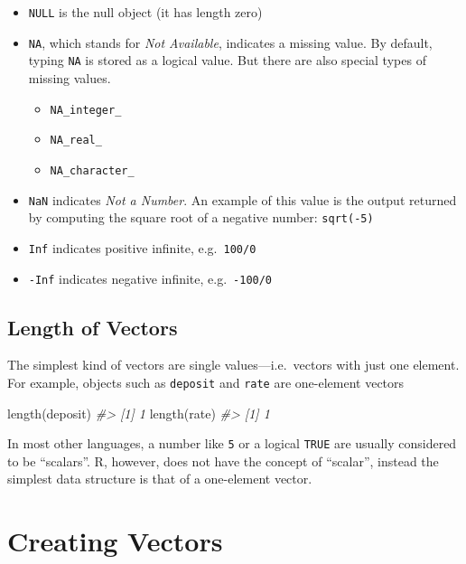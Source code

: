 \documentclass[
]{book}
\newenvironment{Shaded}{\begin{snugshade}}{\end{snugshade}}
\newcommand{\CommentTok}[1]{\textcolor[rgb]{0.56,0.35,0.01}{\textit{#1}}}
\newcommand{\FunctionTok}[1]{\textcolor[rgb]{0.00,0.00,0.00}{#1}}
\newcommand{\NormalTok}[1]{#1}
\providecommand{\tightlist}{%
  \setlength{\itemsep}{0pt}\setlength{\parskip}{0pt}}
\begin{document}
\begin{itemize}
\item
  \texttt{NULL} is the null object (it has length zero)
\item
  \texttt{NA}, which stands for \emph{Not Available}, indicates a missing value. By default,
  typing \texttt{NA} is stored as a logical value. But there are also special types of
  missing values.

  \begin{itemize}
  \tightlist
  \item
    \texttt{NA\_integer\_}
  \item
    \texttt{NA\_real\_}
  \item
    \texttt{NA\_character\_}
  \end{itemize}
\item
  \texttt{NaN} indicates \emph{Not a Number}. An example of this value is the output
  returned by computing the square root of a negative number: \texttt{sqrt(-5)}
\item
  \texttt{Inf} indicates positive infinite, e.g.~\texttt{100/0}
\item
  \texttt{-Inf} indicates negative infinite, e.g.~\texttt{-100/0}
\end{itemize}

\hypertarget{length-of-vectors}{%
\subsection{Length of Vectors}\label{length-of-vectors}}

The simplest kind of vectors are single values---i.e.~vectors with just one
element. For example, objects such as \texttt{deposit} and \texttt{rate} are one-element
vectors

\begin{Shaded}
\begin{Highlighting}[]
\FunctionTok{length}\NormalTok{(deposit)}
\CommentTok{\#\textgreater{} [1] 1}
\FunctionTok{length}\NormalTok{(rate)}
\CommentTok{\#\textgreater{} [1] 1}
\end{Highlighting}
\end{Shaded}

In most other languages, a number like \texttt{5} or a logical \texttt{TRUE} are usually
considered to be ``scalars''. R, however, does not have the concept of ``scalar'',
instead the simplest data structure is that of a one-element vector.

\hypertarget{creating-vectors}{%
\section{Creating Vectors}\label{creating-vectors}}
\end{document}
